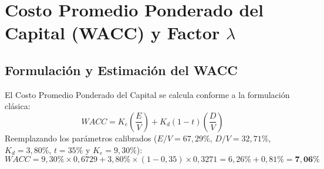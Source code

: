 \documentclass[10pt,a4paper]{article}
\begin{document}
\section{Costo Promedio Ponderado del Capital (WACC) y Factor \texorpdfstring{$\lambda$}{lambda}}

\subsection{Formulación y Estimación del WACC}
El Costo Promedio Ponderado del Capital se calcula conforme a la formulación clásica:
\begin{equation}
    WACC = K_e \left(\frac{E}{V}\right) + K_d (1 - t) \left(\frac{D}{V}\right)
\end{equation}
Reemplazando los parámetros calibrados ($E/V = 67,29\%$, $D/V = 32,71\%$, $K_d = 3,80\%$, $t = 35\%$ y $K_e = 9,30\%$):
\begin{equation}
    WACC = 9,30\% \times 0,6729 + 3,80\% \times (1 - 0,35) \times 0,3271 = 6,26\% + 0,81\% = \mathbf{7,06\%}
\end{equation}
\end{document}
